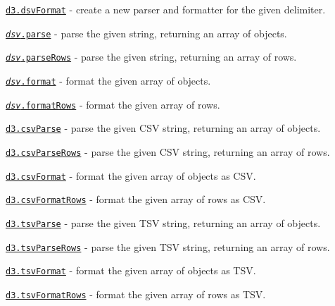 \begin{DoxyItemize}
\item \href{https://github.com/d3/d3-dsv/blob/master/README.md#dsvFormat}{\tt d3.\+dsv\+Format} -\/ create a new parser and formatter for the given delimiter.
\item \href{https://github.com/d3/d3-dsv/blob/master/README.md#dsv_parse}{\tt {\itshape dsv}.parse} -\/ parse the given string, returning an array of objects.
\item \href{https://github.com/d3/d3-dsv/blob/master/README.md#dsv_parseRows}{\tt {\itshape dsv}.parse\+Rows} -\/ parse the given string, returning an array of rows.
\item \href{https://github.com/d3/d3-dsv/blob/master/README.md#dsv_format}{\tt {\itshape dsv}.format} -\/ format the given array of objects.
\item \href{https://github.com/d3/d3-dsv/blob/master/README.md#dsv_formatRows}{\tt {\itshape dsv}.format\+Rows} -\/ format the given array of rows.
\item \href{https://github.com/d3/d3-dsv/blob/master/README.md#csvParse}{\tt d3.\+csv\+Parse} -\/ parse the given C\+SV string, returning an array of objects.
\item \href{https://github.com/d3/d3-dsv/blob/master/README.md#csvParseRows}{\tt d3.\+csv\+Parse\+Rows} -\/ parse the given C\+SV string, returning an array of rows.
\item \href{https://github.com/d3/d3-dsv/blob/master/README.md#csvFormat}{\tt d3.\+csv\+Format} -\/ format the given array of objects as C\+SV.
\item \href{https://github.com/d3/d3-dsv/blob/master/README.md#csvFormatRows}{\tt d3.\+csv\+Format\+Rows} -\/ format the given array of rows as C\+SV.
\item \href{https://github.com/d3/d3-dsv/blob/master/README.md#tsvParse}{\tt d3.\+tsv\+Parse} -\/ parse the given T\+SV string, returning an array of objects.
\item \href{https://github.com/d3/d3-dsv/blob/master/README.md#tsvParseRows}{\tt d3.\+tsv\+Parse\+Rows} -\/ parse the given T\+SV string, returning an array of rows.
\item \href{https://github.com/d3/d3-dsv/blob/master/README.md#tsvFormat}{\tt d3.\+tsv\+Format} -\/ format the given array of objects as T\+SV.
\item \href{https://github.com/d3/d3-dsv/blob/master/README.md#tsvFormatRows}{\tt d3.\+tsv\+Format\+Rows} -\/ format the given array of rows as T\+SV.
\end{DoxyItemize}

